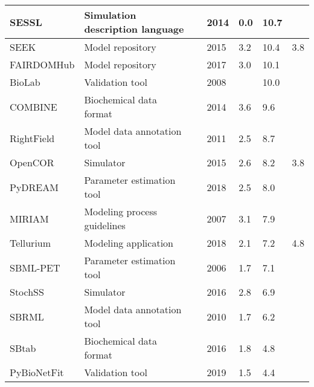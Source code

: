 \begin{longtable}{L{2.2cm}L{4cm}L{1cm}L{0.8cm}R{1.1cm}R{1cm}R{1cm}}
\midrule
\small{SESSL} &\small{Simulation description language} &\cite{Ewald2014SESSL:Experiments} &\small{2014} &\small{0.0} &\small{10.7} &\small{}\\
\midrule
\small{SEEK} &\small{Model repository} &\cite{Wolstencroft2015SEEK:Platform} &\small{2015} &\small{3.2} &\small{10.4} &\small{3.8}\\
\midrule
\small{FAIRDOMHub} &\small{Model repository} &\cite{Wolstencroft2017FAIRDOMHub:Research.} &\small{2017} &\small{3.0} &\small{10.1} &\small{}\\
\midrule
\small{BioLab} &\small{Validation tool} &\cite{Clarke2008StatisticalPathway} &\small{2008} &\small{} &\small{10.0} &\small{}\\
\midrule
\small{COMBINE} &\small{Biochemical data format} &\cite{Bergmann2014COMBINEProject} &\small{2014} &\small{3.6} &\small{9.6} &\small{}\\
\midrule
\small{RightField} &\small{Model data annotation tool} &\cite{Wolstencroft2011RightField:Spreadsheets} &\small{2011} &\small{2.5} &\small{8.7} &\small{}\\
\midrule
\small{OpenCOR} &\small{Simulator} &\cite{garny2015opencor} &\small{2015} &\small{2.6} &\small{8.2} &\small{3.8}\\
\midrule
\small{PyDREAM} &\small{Parameter estimation tool} &\cite{Shockley2018PyDREAM:Python} &\small{2018} &\small{2.5} &\small{8.0} &\small{}\\
\midrule
\small{MIRIAM} &\small{Modeling process guidelines} &\cite{Laibe2007MIRIAMBiology.} &\small{2007} &\small{3.1} &\small{7.9} &\small{}\\
\midrule
\small{Tellurium} &\small{Modeling application} &\cite{Choi2018Tellurium:Biology} &\small{2018} &\small{2.1} &\small{7.2} &\small{4.8}\\
\midrule
\small{SBML-PET} &\small{Parameter estimation tool} &\cite{Zi2006SBML-PET:Tool} &\small{2006} &\small{1.7} &\small{7.1} &\small{}\\
\midrule
\small{StochSS} &\small{Simulator} &\cite{drawert2016stochastic} &\small{2016} &\small{2.8} &\small{6.9} &\small{}\\
\midrule
\small{SBRML} &\small{Model data annotation tool} &\cite{Dada2010SBRML:Models} &\small{2010} &\small{1.7} &\small{6.2} &\small{}\\
\midrule
\small{SBtab} &\small{Biochemical data format} &\cite{Lubitz2016SBtab:Biology} &\small{2016} &\small{1.8} &\small{4.8} &\small{}\\
\midrule
\small{PyBioNetFit} &\small{Validation tool} &\cite{Mitra2019PyBioNetFitLanguage} &\small{2019} &\small{1.5} &\small{4.4} &\small{}\\

\end{longtable}
